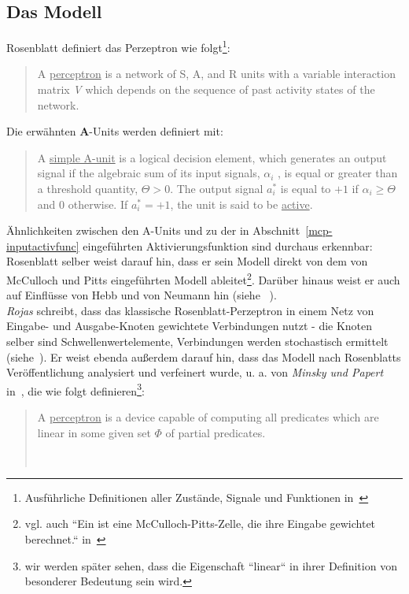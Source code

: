 \subsection{Das Modell}

Rosenblatt definiert das Perzeptron wie folgt\footnote{
    Ausführliche Definitionen aller Zustände, Signale und Funktionen in~\cite[79 - 94]{Ros62}
}:

\blockquote[{\cite[83 ``DEFINITION 17``; Hervorhebung i.O.]{Ros62}}]{
    A \underline{perceptron} is a network of S, A, and R units with a variable interaction matrix \textit{V} which depends on the
    sequence of past activity states of the network.
}

Die erwähnten \textbf{A}-Units werden definiert mit:

\blockquote[{\cite[81  ``DEFINITION 9``; Hervorhebung i.O.]{Ros62}}]{
    A \underline{simple A-unit} is a logical decision element, which
    generates an output signal if the algebraic sum of its
    input signals, $\alpha_i$ , is equal or greater than a threshold
    quantity, $\Theta > 0$. The output signal $a^*_i$ is equal to $+1$ if $\alpha_i \geq \Theta$ and $0$ otherwise. If $a^*_i = +1$,
    the unit is said to be \underline{active}.
}


Ähnlichkeiten zwischen den A-Units und zu der in Abschnitt~\ref{mcp-inputactivfunc} eingeführten Aktivierungsfunktion sind durchaus erkennbar: Rosenblatt selber weist darauf hin, dass er sein Modell direkt von dem von McCulloch und Pitts eingeführten Modell ableitet\footnote{
    vgl. auch ``Ein  ist eine McCulloch-Pitts-Zelle, die ihre Eingabe gewichtet berechnet.`` in~\cite[57, ``Definition 3.1``; Hervorhebung i.O.]{Roj93}
}. Darüber hinaus weist er auch auf Einflüsse von Hebb und von Neumann hin (siehe ~\cite[5]{Ros62}).\\


\textit{Rojas} schreibt, dass das klassische Rosenblatt-Perzeptron in einem Netz von Eingabe- und Ausgabe-Knoten gewichtete Verbindungen nutzt - die Knoten selber sind Schwellenwertelemente, Verbindungen werden stochastisch ermittelt (siehe~\cite[51]{Roj93}).
Er weist ebenda außerdem darauf hin, dass das Modell nach Rosenblatts Veröffentlichung analysiert und verfeinert wurde, u. a. von \textit{Minsky und Papert} in~\cite{MP88}, die wie folgt definieren\footnote{wir werden später sehen, dass die Eigenschaft ``linear`` in ihrer Definition von besonderer Bedeutung sein wird.}:

\blockquote[{~\cite[12; Hervorhebung i.O.]{MP88}}]{
    A \underline{perceptron} is a device capable of computing all predicates which are linear in some given set $\Phi$ of partial predicates.
}

